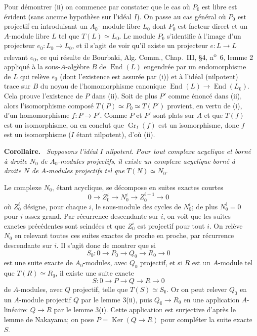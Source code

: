 \documentclass[11pt]{article}
\newenvironment{statement}[1]{\par\medskip\noindent\textbf{#1.}\ }{\par\medskip}
\providecommand{\Ker}{\operatorname{Ker}}
\providecommand{\End}{\operatorname{End}}
\providecommand{\Ker}{\operatorname{Ker}}
\providecommand{\Ker}{\operatorname{Ker}}
\providecommand{\End}{\operatorname{End}}
\begin{document}
Pour démontrer (ii) on commence par constater que le cas où $P_0$ est libre est évident (sans aucune hypothèse sur l'idéal $I$). On passe au cas général où $P_0$ est projectif en introduisant un $A_0$-%
module libre $L_0$ dont $P_0$ est facteur direct et un $A$-module libre $L$ tel que $T(L)\simeq L_0$. Le module $P_0$ s'identifie à l'image d'un projecteur $e_0:L_0\to L_0$, et il s'agit de voir qu'il existe un projecteur $e:L\to L$ relevant $e_0$, ce qui résulte de Bourbaki, Alg. Comm., Chap.~III, §4, n\textsuperscript{o}~6, lemme 2 appliqué à la sous-$A$-algèbre $B$ de $\End(L)$ engendrée par un endomorphisme de $L$ qui relève $e_0$ (dont l'existence est assurée par (i)) et à l'idéal (nilpotent) trace sur $B$ du noyau de l'homomorphisme canonique $\End(L)\to\End(L_0)$. Cela prouve l'existence de $P$ dans (ii). Soit de plus $P'$ comme énoncé dans (ii), alors l'isomorphisme composé $T(P)\simeq P_0\simeq T(P')$ provient, en vertu de (i), d'un homomorphisme $f:P\to P'$. Comme $P$ et $P'$ sont plats sur $A$ et que $T(f)$ est un isomorphisme, on en conclut que $\operatorname{Gr}_I(f)$ est un isomorphisme, donc $f$ est un isomorphisme ($I$ étant nilpotent), d'où (ii).

\begin{statement}{Corollaire}
\emph{Supposons l'idéal $I$ nilpotent}. \emph{Pour tout complexe acyclique et borné à droite $N_0$ de $A_0$-modules projectifs}, \emph{il existe un complexe acyclique borné à droite $N$ de $A$-modules projectifs tel que} $T(N)\simeq N_0$.
\end{statement}

Le complexe $N_0$, étant acyclique, se décompose en suites exactes courtes
\[
0\longrightarrow Z_0^i\longrightarrow N_0^i\longrightarrow Z_0^{i+1}\longrightarrow0
\]
où $Z_0^i$ désigne, pour chaque $i$, le sous-module des cycles de $N_0^i$; de plus $N_0^i=0$ pour $i$ assez grand. Par récurrence descendante sur $i$, on voit que les suites exactes précédentes sont scindées et que $Z_0^i$ est projectif pour tout $i$. On relève $N_0$ en relevant toutes 
ces
suites exactes de proche en proche, par récurrence descendante sur $i$. Il s'agit donc de montrer que si
\[
S_0:0\longrightarrow P_0\longrightarrow Q_0\longrightarrow R_0\longrightarrow0
\]
est une suite exacte de $A_0$-modules, avec $Q_0$ projectif, et si $R$ est un $A$-module tel que $T(R)\simeq R_0$, il existe une suite exacte
\[
S:0\longrightarrow P\longrightarrow Q\longrightarrow R\longrightarrow0
\]
de $A$-modules, avec $Q$ projectif, telle que $T(S)\simeq S_0$. Or on peut relever $Q_0$ en un $A$-module projectif $Q$ par le lemme 3(ii), puis $Q_0\to R_0$ en une application $A$-linéaire: $Q\to R$ par le lemme 3(i). Cette application est surjective d'après le lemme de Nakayama; on pose $P=\Ker(Q\to R)$ pour compléter la suite exacte $S$.
\end{document}
